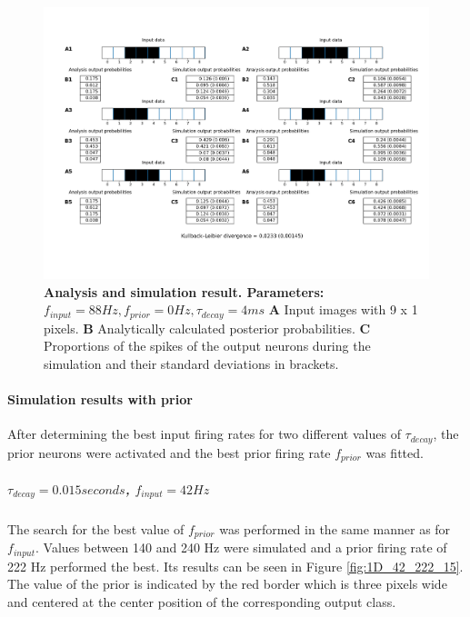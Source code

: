 \begin{figure}
  \includegraphics[width=\linewidth]{figures/1D/1D_88_0_4.png}
  \caption{\textbf{Analysis and simulation result. Parameters: } $f_{input} = 88 Hz, f_{prior} = 0 Hz, \tau_{decay} = 4 ms$ \textbf{A} Input images with 9 x 1 pixels. \textbf{B} Analytically calculated posterior probabilities. \textbf{C} Proportions of the spikes of the output neurons during the simulation and their standard deviations in brackets.}
  \label{fig:1D_88_0_4}
\end{figure}

\paragraph{Simulation results with prior}
After determining the best input firing rates for two different values of $\tau_{decay}$, the prior neurons were activated and the best prior firing rate $f_{prior}$ was fitted.
\subparagraph{$\tau_{decay} = 0.015 seconds$, $f_{input} = 42 Hz$}
The search for the best value of $f_{prior}$ was performed in the same manner as for $f_{input}$. Values between 140 and 240 Hz were simulated and a prior firing rate of 222 Hz performed the best. Its results can be seen in Figure \ref{fig:1D_42_222_15}. The value of the prior is indicated by the red border which is three pixels wide and centered at the center position of the corresponding output class.

